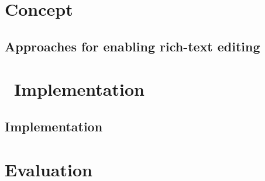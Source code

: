 






\part{Concept}
\label{part-concept}

\chapter{Approaches for enabling rich-text editing}
\label{ch:approaches}



\part{\ Implementation}
\label{part:implementation}

\chapter{Implementation}
\label{ch:impl}



\part{Evaluation}
\label{part:evaluation}

